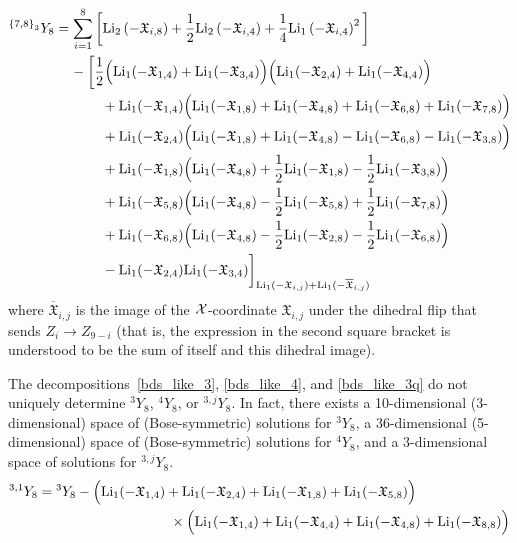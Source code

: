 \documentclass[11pt]{article}
\def\LiOneCalX#1#2{\text{Li}_1(-\mathfrak{X}_{#1,#2})}
\def\LiOneBarCalX#1#2{\text{Li}_1(-\overline{\mathfrak{X}}_{#1,#2})}
\begin{document}
 \begin{align}
{}^{{\{7,8\}}_3} Y_{8} &= \sum_{i=1}^8 \bigg[ \text{Li}_2 \left( - \mathfrak{X}_{i,8} \right) + \frac12 \text{Li}_2 \left(- \mathfrak{X}_{i,4}  \right) + \frac14 \text{Li}_1\left(- \mathfrak{X}_{i,4} \right)^2 \bigg] \nonumber \\
&\hspace{.4cm}- \bigg[ \frac 12\Big( \LiOneCalX{1}{4} + \LiOneCalX{3}{4} \Big) \Big( \LiOneCalX{2}{4} + \LiOneCalX{4}{4} \Big)  \nonumber \\
&\hspace{1.2cm} + \LiOneCalX{1}{4}  \Big( \LiOneCalX{1}{8} + \LiOneCalX{4}{8} + \LiOneCalX{6}{8} + \LiOneCalX{7}{8} \Big) \nonumber \\ 
&\hspace{1.2cm} + \LiOneCalX{2}{4}  \Big( \LiOneCalX{1}{8} + \LiOneCalX{4}{8} - \LiOneCalX{6}{8}  -  \LiOneCalX{3}{8} \Big) \\
&\hspace{1.2cm} + \LiOneCalX{1}{8}  \Big( \LiOneCalX{4}{8} + \frac12  \LiOneCalX{1}{8} - \frac12 \LiOneCalX{3}{8} \Big) \nonumber \\
&\hspace{1.2cm} + \LiOneCalX{5}{8}  \Big( \LiOneCalX{4}{8} - \frac12  \LiOneCalX{5}{8} + \frac12 \LiOneCalX{7}{8} \Big) \nonumber \\
&\hspace{1.2cm} + \LiOneCalX{6}{8}  \Big( \LiOneCalX{4}{8} - \frac12  \LiOneCalX{2}{8} - \frac12 \LiOneCalX{6}{8} \Big)\nonumber \\
&\hspace{1.2cm} - \LiOneCalX{2}{4} \LiOneCalX{3}{4} \bigg]_{\LiOneCalX{i}{j} + \LiOneBarCalX{i}{j}} \nonumber
\end{align}
where $\overline{\mathfrak{X}}_{i,j}$ is the image of the ${\cal X}$-coordinate $\mathfrak{X}_{i,j}$ under the dihedral flip that sends $Z_i \rightarrow Z_{9-i}$ (that is, the expression in the second square bracket is understood to be the sum of itself and this dihedral image). 


The decompositions~\eqref{bds_like_3}, \eqref{bds_like_4}, and \eqref{bds_like_3q} do not uniquely determine ${}^{3} Y_{8}$, ${}^{4} Y_{8}$, or ${}^{3,j} Y_{8}$. In fact, there exists a 10-dimensional (3-dimensional) space of (Bose-symmetric) solutions for ${}^{3} Y_{8}$, a 36-dimensional (5-dimensional) space of (Bose-symmetric) solutions for ${}^{4} Y_{8}$, and a 3-dimensional space of solutions for ${}^{3,j} Y_{8}$. 
 \begin{align}
{}^{3,1}Y_8 &= {}^{3}Y_8 -
\Big( \text{Li}_1(-\mathfrak{X}_{1, 4}) + \text{Li}_1(-\mathfrak{X}_{2, 4}) + \text{Li}_1(-\mathfrak{X}_{1, 8}) + \text{Li}_1(-\mathfrak{X}_{5, 8}) \Big)  \\
&\hspace{3.4cm} \times \Big( \text{Li}_1(-\mathfrak{X}_{1, 4}) + \text{Li}_1(-\mathfrak{X}_{4, 4}) + \text{Li}_1(-\mathfrak{X}_{4, 8}) + \text{Li}_1(-\mathfrak{X}_{8, 8}) \Big) \nonumber
\end{align}
\end{document}

